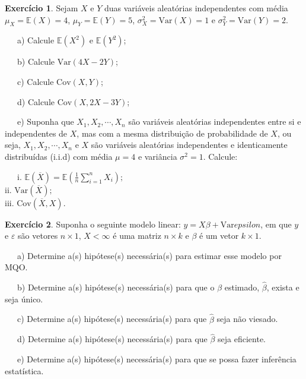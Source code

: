 \documentclass[
]{book}
\theoremstyle{definition}
\theoremstyle{definition}
\theoremstyle{definition}
\newtheorem{exercise}{Exercício}[chapter]
\theoremstyle{remark}
\begin{document}
\begin{exercise}
\protect\hypertarget{exr:exerint2}{}{\label{exr:exerint2} }Sejam \(X\) e \(Y\) duas variáveis aleatórias independentes com média \(\mu_X=\mathbb{E}(X)=4\), \(\mu_Y=\mathbb{E}(Y)=5\), \(\sigma^2_X=\mbox{Var}(X)=1\) e \(\sigma_Y^2=\mbox{Var}(Y)=2.\)

~~~a) Calcule \(\mathbb{E}(X^2)\) e \(\mathbb{E}(Y^2)\);

~~~b) Calcule \(\mbox{Var}(4X-2Y)\);

~~~c) Calcule \(\mbox{Cov}(X,Y)\);

~~~d) Calcule \(\mbox{Cov}(X,2X-3Y)\);

~~~e) Suponha que \(X_1,X_2,\cdots,X_n\) são variáveis aleatórias independentes entre si e independentes de \(X\), mas com a mesma distribuição de probabilidade de \(X\), ou seja, \(X_1,X_2,\cdots,X_n\) e \(X\) são variáveis aleatórias independentes e identicamente distribuídas (i.i.d) com média \(\mu=4\) e variância \(\sigma^2=1\). Calcule:

~~~i. \(\mathbb{E}(\overline{X})=\mathbb{E}\left(\frac{1}{n}\sum_{i=1}^{n}X_i\right);\)\\
\hspace*{0.333em}\hspace*{0.333em}\hspace*{0.333em}ii. \(\mbox{Var}(\overline{X});\)\\
\hspace*{0.333em}\hspace*{0.333em}\hspace*{0.333em}iii. \(\mbox{Cov}(\overline{X},X).\)
\end{exercise}

\begin{exercise}
\protect\hypertarget{exr:exerint3}{}{\label{exr:exerint3} }Suponha o seguinte modelo linear: \(y=X\beta+\mbox{Var}epsilon\), em que \(y\) e \(\varepsilon\) são vetores \(n\times 1\), \(X<\infty\) é uma
matriz \(n\times k\) e \(\beta\) é um vetor \(k\times 1\).

~~~a) Determine a(s) hipótese(s) necessária(s) para estimar esse modelo por MQO.

~~~b) Determine a(s) hipótese(s) necessária(s) para que o \(\beta\) estimado, \(\hat{\beta}\), exista e seja único.

~~~c) Determine a(s) hipótese(s) necessária(s) para que \(\hat{\beta}\) seja não viesado.

~~~d) Determine a(s) hipótese(s) necessária(s) para que \(\hat{\beta}\) seja eficiente.

~~~e) Determine a(s) hipótese(s) necessária(s) para que se possa fazer inferência estatística.
\end{exercise}
\end{document}
